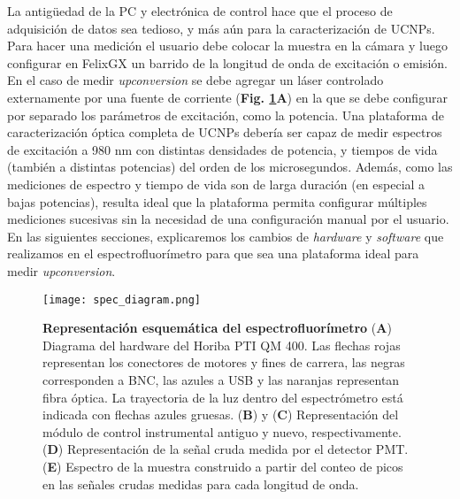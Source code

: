 La antigüedad de la PC y electrónica de control hace que el proceso de adquisición de datos sea tedioso, y más aún para la caracterización de UCNPs.
Para hacer una medición el usuario debe colocar la muestra en la cámara y luego configurar en FelixGX un barrido de la longitud de onda de excitación o emisión.
En el caso de medir \textit{upconversion} se debe agregar un láser controlado externamente por una fuente de corriente (\textbf{Fig. \ref{fig:ref-diagram}A}) en la que se debe configurar por separado los parámetros de excitación, como la potencia.
Una plataforma de caracterización óptica completa de UCNPs debería ser capaz de medir espectros de excitación a 980 nm con distintas densidades de potencia, y tiempos de vida (también a distintas potencias) del orden de los microsegundos.
Además, como las mediciones de espectro y tiempo de vida son de larga duración (en especial a bajas potencias), resulta ideal que la plataforma permita configurar múltiples mediciones sucesivas sin la necesidad de una configuración manual por el usuario.
En las siguientes secciones, explicaremos los cambios de \textit{hardware} y \textit{software} que realizamos en el espectrofluorímetro para que sea una plataforma ideal para medir \textit{upconversion}.



\begin{figure}[btp]
     \centering
     \texttt{[image: spec\_diagram.png]}
     \caption{
     \textbf{Representación esquemática del espectrofluorímetro}
     (\textbf{A}) Diagrama del hardware del Horiba PTI QM 400. Las flechas rojas representan los conectores de motores y fines de carrera, las negras corresponden a BNC, las azules a USB y las naranjas representan fibra óptica. La trayectoria de la luz dentro del espectrómetro está indicada con flechas azules gruesas.
     (\textbf{B}) y (\textbf{C}) Representación del módulo de control instrumental antiguo y nuevo, respectivamente.
     (\textbf{D}) Representación de la señal cruda medida por el detector PMT.
     (\textbf{E}) Espectro de la muestra construido a partir del conteo de picos en las señales crudas medidas para cada longitud de onda.
    }
     \label{fig:ref-diagram}
\end{figure}


